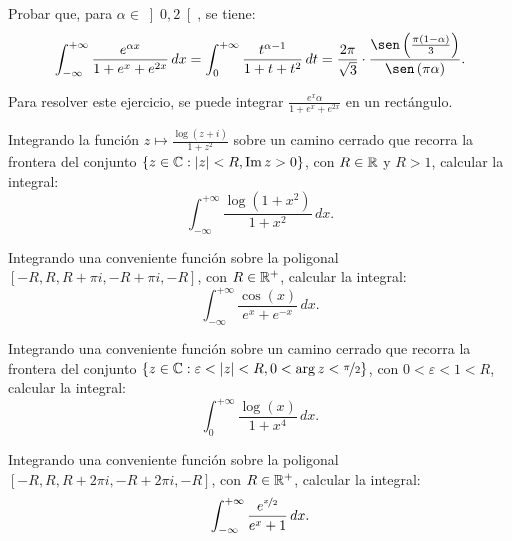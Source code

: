 \begin{ejercicio}
    Probar que, para $\alpha \in \left]0, 2\right[$, se tiene:
    \begin{equation*}
        \int_{-\infty}^{+\infty} \frac{e^{\alpha x}}{1 + e^x + e^{2x}} \, dx = \int_0^{+\infty} \frac{t^{\alpha - 1}}{1 + t + t^2} \, dt = \dfrac{2\pi}{\sqrt{3}}\cdot \dfrac{\sen\left(\frac{\pi(1 - \alpha)}{3}\right)}{\sen\left(\pi \alpha\right)}.
    \end{equation*}
    \begin{observacion}
        Para resolver este ejercicio, se puede integrar $\frac{e^x \alpha}{1 + e^x + e^{2x}}$ en un rectángulo.
    \end{observacion}
\end{ejercicio}

\begin{ejercicio}
    Integrando la función $z \mapsto \frac{\log(z + i)}{1 + z^2}$ sobre un camino cerrado que recorra la frontera del conjunto $\{z \in \mathbb{C} : |z| < R, \operatorname{Im} z > 0\}$, con $R \in \mathbb{R}$ y $R > 1$, calcular la integral:
    \begin{equation*}
        \int_{-\infty}^{+\infty} \frac{\log(1 + x^2)}{1 + x^2} \, dx.
    \end{equation*}
\end{ejercicio}

\begin{ejercicio}
    Integrando una conveniente función sobre la poligonal $[-R, R, R + \pi i, -R + \pi i, -R]$, con $R \in \mathbb{R}^+$, calcular la integral:
    \begin{equation*}
        \int_{-\infty}^{+\infty} \frac{\cos(x)}{e^x + e^{-x}} \, dx.
    \end{equation*}
\end{ejercicio}

\begin{ejercicio}
    Integrando una conveniente función sobre un camino cerrado que recorra la frontera del conjunto $\{z \in \mathbb{C} : \varepsilon < |z| < R, 0 < \arg z < \nicefrac{\pi}{2}\}$, con $0 < \varepsilon < 1 < R$, calcular la integral:
    \begin{equation*}
        \int_0^{+\infty} \frac{\log(x)}{1 + x^4} \, dx.
    \end{equation*}
\end{ejercicio}

\begin{ejercicio}
    Integrando una conveniente función sobre la poligonal $[-R, R, R + 2\pi i, -R + 2\pi i, -R]$, con $R \in \mathbb{R}^+$, calcular la integral:
    \begin{equation*}
        \int_{-\infty}^{+\infty} \frac{e^{\nicefrac{x}{2}}}{e^x + 1} \, dx.
    \end{equation*}
\end{ejercicio}